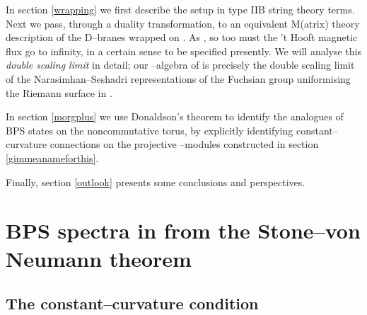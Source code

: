 \documentclass[a4paper,a4paper]{article}
\begin{document}
In section \ref{wrapping} we first describe the setup in type IIB string theory terms. 
Next we pass, through a duality transformation, to an equivalent M(atrix) theory 
description of the \coordHE{} D\coordHE{}--branes wrapped on \myHighlight{$\Sigma$}\coordHE{}. As \coordHE{}, 
so too must the 't Hooft magnetic flux \coordHE{} go to infinity, in a certain sense to be 
specified presently. We will analyse this {\it double scaling limit} in detail; 
our \coordHE{}--algebra of \cite{PROCEEDINGS} is precisely the double scaling limit 
of the Narasimhan--Seshadri representations of the Fuchsian group \myHighlight{$\Gamma$}\coordHE{} 
uniformising the Riemann surface \myHighlight{$\Sigma$}\coordHE{} in \coordHE{}. 

In section \ref{morgplus} we use Donaldson's theorem to identify the \coordHE{} 
analogues of BPS states on the noncommutative torus, by explicitly identifying 
constant--curvature connections on the projective \coordHE{}--modules 
constructed in section \ref{gimmeanameforthis}. 

Finally, section \ref{outlook} presents some conclusions and perspectives. 

\section{BPS spectra in \coordHE{} from the Stone--von Neumann theorem}\label{morita}  
   
\subsection{The constant--curvature condition}\label{ccurvcon}  
  
\end{document}
